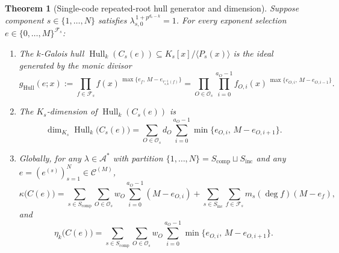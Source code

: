\documentclass[preprint,12pt]{elsarticle}
\newcommand{\A}{\mathcal A}
\newcommand{\Fs}{\mathcal F_s}
\newcommand{\Os}{\mathcal O_s}
\newcommand{\Hull}{\operatorname{Hull}}
\numberwithin{equation}{section}
\theoremstyle{plain}
\newtheorem{theorem}{Theorem}[section]
\theoremstyle{definition}
\theoremstyle{remark}
\begin{document}
\begin{theorem}[Single-code repeated-root hull generator and dimension]\label{thm:hull-dimension}
Suppose component $s\in\{1,\dots,N\}$ satisfies
$\lambda_{s,0}^{\,1+p^{d_s-k}}=1$. For every exponent selection
$e\in\{0,\dots,M\}^{\Fs}$:
\begin{enumerate}
\item[\textup{(a)}] The $k$-Galois hull $\Hull_k(C_s(e))\subseteq K_s[x]/\langle
P_s(x)\rangle$ is the ideal generated by the monic divisor
\begin{equation}\label{eq:hull-generator}
g_{\Hull}(e;x):=\prod_{f\in\Fs} f(x)^{\,\max\{e_f,\,M-e_{\tau_{s,k}^{-1}(f)}\}}
              =\prod_{O\in\Os}\prod_{i=0}^{a_O-1}
                f_{O,i}(x)^{\,\max\{e_{O,i},\,M-e_{O,i-1}\}}.
\end{equation}
\item[\textup{(b)}] The $K_s$-dimension of $\Hull_k(C_s(e))$ is
\begin{equation}\label{eq:hull-min-component}
\dim_{K_s}\Hull_k\bigl(C_s(e)\bigr)
 =\sum_{O\in\Os} d_O\sum_{i=0}^{a_O-1}\min\bigl\{e_{O,i},\,M-e_{O,i+1}\bigr\}.
\end{equation}
\item[\textup{(c)}] Globally, for any $\lambda\in\A^*$ with partition
$\{1,\dots,N\}=S_{\mathrm{comp}}\sqcup S_{\mathrm{inc}}$ and any
$e=(e^{(s)})_{s=1}^{N}\in\mathscr C^{(M)}$,
\begin{equation}\label{eq:global-code-hull-orbit}
\kappa\bigl(C(e)\bigr)
 =\sum_{s\in S_{\mathrm{comp}}}\sum_{O\in\Os} w_O\sum_{i=0}^{a_O-1}(M-e_{O,i})
  +\sum_{s\in S_{\mathrm{inc}}}\sum_{f\in\Fs} m_s(\deg f)(M-e_f),
\end{equation}
and
\begin{equation}\label{eq:global-hull-orbit}
\eta_k\bigl(C(e)\bigr)
 =\sum_{s\in S_{\mathrm{comp}}}\sum_{O\in\Os} w_O
   \sum_{i=0}^{a_O-1}\min\bigl\{e_{O,i},\,M-e_{O,i+1}\bigr\}.
\end{equation}
\end{enumerate}
\end{theorem}
\end{document}
